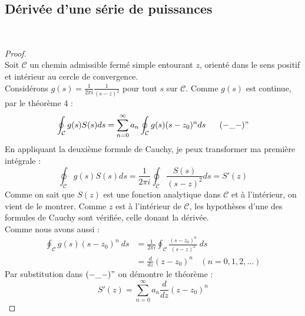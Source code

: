 	\subsection{Dérivée d'une série de puissances}
	\ \\	
	\begin{proof}\ \\
	Soit $\mathcal{C}$ un chemin admissible fermé simple entourant $z$, orienté dans le sens 
	positif et intérieur au cercle de convergence.\\
	Considérons $g(s) = \frac{1}{2\pi i}\frac{1}{(s-z)^2}$ pour tout $s$ sur $\mathcal{C}$.
	Comme $g(s)$ est continue, par le théorème 4 :
	\begin{equation}
	\oint_\mathcal{C}g(s) S(s) ds = \sum_{n=0}^\infty a_n\oint_\mathcal{C}g(s)(s-z_0)^n ds\ \ \ \ \ (-\_-)"
	\end{equation}
	En appliquant la deuxième formule de Cauchy, je peux transformer ma première intégrale :
	\begin{equation}
	\oint_\mathcal{C}g(s) S(s) ds = \frac{1}{2\pi i}\oint_\mathcal{C}\frac{S(s)}{(s-z)^2}ds = 
	S'(z)
	\end{equation}
	Comme on sait que $S(z)$ est une fonction analytique dans $\mathcal{C}$ et à l'intérieur, 
	on vient de le montrer. Comme $z$ est à l'intérieur de $\mathcal{C}$, les hypothèses d'une 
	des formules de Cauchy sont vérifiée, celle donant la dérivée. \\
	Comme nous avons aussi :
	\begin{equation}
	\begin{array}{ll}
	\oint_\mathcal{C} g(s)(s-z_0)^n\ ds &= \frac{1}{2\pi i}\oint_\mathcal{C}\frac{(s-z_0)^n}{
	(s-z)^2}\ ds\\
	 &= \frac{d}{dz}(z-z_0)^n\ \ \ \ (n=0,1,2,\dots)
	\end{array}
	\end{equation}
	Par substitution dans $(-\_-)"$ on démontre le théorème :
	\begin{equation}
	S'(z) = \sum_{n=0}^\infty a_n\frac{d}{dz}(z-z_0)^n
	\end{equation}
	\end{proof}

